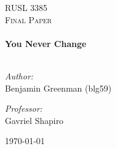 \begin{titlepage}
\begin{center}


\textsc{\LARGE RUSL 3385}\\[1.5cm]

\textsc{\Large Final Paper}\\[0.5cm]

\HRule \\[0.4cm]
{ \huge \bfseries You Never Change}\\[0.4cm]

\HRule \\[1.5cm]

\begin{minipage}{0.4\textwidth}
\begin{flushleft} \large
\emph{Author:}\\
Benjamin Greenman
(blg59)
\end{flushleft}
\end{minipage}
\begin{minipage}{0.4\textwidth}
\begin{flushright} \large
\emph{Professor:} \\
Gavriel Shapiro
\end{flushright}
\end{minipage}

\vfill

{\large \today}

\end{center}
\end{titlepage}
